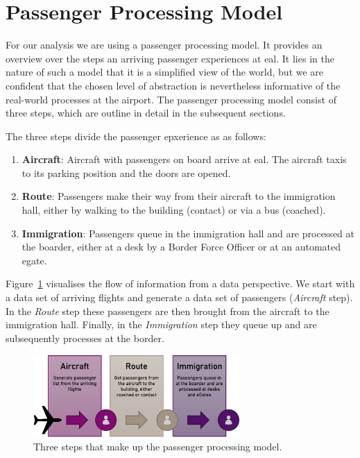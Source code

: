 \documentclass[10pt]{article}
\begin{document}
\section{Passenger Processing Model}

For our analysis we are using a passenger processing model. It provides an overview over the steps an arriving passenger experiences at \gls{eal}. It lies in the nature of such a model that it is a simplified view of the world, but we are confident that the chosen level of abstraction is nevertheless informative of the real-world processes at the airport. The passenger processing model consist of three steps, which are outline in detail in the subsequent sections.

The three steps divide the passenger epxerience as as follows:
\begin{enumerate}
    \item \textbf{Aircraft}: Aircraft with passengers on board arrive at \gls{eal}. The aircraft taxis to its parking position and the doors are opened. \label{step:aircraft}
    \item \textbf{Route}: Passengers make their way from their aircraft to the immigration hall, either by walking to the building (contact) or via a bus (coached). \label{step:route}
    \item \textbf{Immigration}: Passengers queue in the immigration hall and are processed at the boarder, either at a desk by a Border Force Officer or at an automated \gls{egate}. \label{step:immigration}
\end{enumerate}

 Figure~\ref{fig:PPM_threesteps} visualises the flow of information from a data perspective. We start with a data set of arriving flights and generate a data set of passengers (\textit{Aircraft} step). In the \textit{Route} step these passengers are then brought from the aircraft to the immigration hall. Finally, in the \textit{Immigration} step they queue up and are subsequently processes at the border.

\begin{figure}[!ht]
    \centering
    \includegraphics[width=0.7\textwidth]{figures/ThreeSteps.png}
     \caption{Three steps that make up the passenger processing model.  } \label{fig:PPM_threesteps}
\end{figure}
\end{document}
